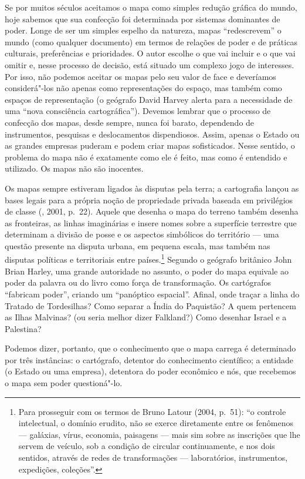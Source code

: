 Se por muitos séculos aceitamos o mapa como simples redução gráfica do
mundo, hoje sabemos que sua confecção foi determinada por sistemas
dominantes de poder. Longe de ser um simples espelho da natureza, mapas
``redescrevem'' o mundo (como qualquer documento) em termos de relações
de poder e de práticas culturais, preferências e prioridades. O autor
escolhe o que vai incluir e o que vai omitir e, nesse processo de
decisão, está situado um complexo jogo de interesses. Por isso, não
podemos aceitar os mapas pelo seu valor de face e deveríamos
considerá"-los não apenas como representações do espaço, mas também como
espaços de representação (o geógrafo David Harvey alerta para a
necessidade de uma ``nova consciência cartográfica''). Devemos lembrar
que o processo de confecção dos mapas, desde sempre, nunca foi barato,
dependendo de instrumentos, pesquisas e deslocamentos dispendiosos.
Assim, apenas o Estado ou as grandes empresas puderam e podem criar
mapas sofisticados. Nesse sentido, o problema do mapa não é exatamente
como ele é feito, mas como é entendido e utilizado. Os mapas não são
inocentes.

Os mapas sempre estiveram ligados às disputas pela terra; a cartografia
lançou as bases legais para a própria noção de propriedade privada
baseada em privilégios de classe (, 2001, p.~22). Aquele que
desenha o mapa do terreno também desenha as fronteiras, as linhas
imaginárias e insere nomes sobre a superfície terrestre que determinam a
divisão de posse e os aspectos simbólicos do território --- uma questão
presente na disputa urbana, em pequena escala, mas também nas disputas
políticas e territoriais entre países.\footnote{Para prosseguir com os
  termos de Bruno Latour (2004, p.~51): ``o controle intelectual, o
  domínio erudito, não se exerce diretamente entre os fenômenos ---
  galáxias, vírus, economia, paisagens --- mais sim sobre as inscrições
  que lhe servem de veículo, sob a condição de circular continuamente, e
  nos dois sentidos, através de redes de transformações --- laboratórios,
  instrumentos, expedições, coleções''.} Segundo o geógrafo britânico
John Brian Harley, uma grande autoridade no assunto, o poder do mapa
equivale ao poder da palavra ou do livro como força de transformação. Os
cartógrafos ``fabricam poder'', criando um ``panóptico espacial''.
Afinal, onde traçar a linha do Tratado de Tordesilhas? Como separar a
Índia do Paquistão? A quem pertencem as Ilhas Malvinas? (ou seria melhor
dizer Falkland?) Como desenhar Israel e a Palestina?

Podemos dizer, portanto, que o conhecimento que o mapa carrega é
determinado por três instâncias: o cartógrafo, detentor do conhecimento
científico; a entidade (o Estado ou uma empresa), detentora do poder
econômico e nós, que recebemos o mapa sem poder questioná"-lo.

